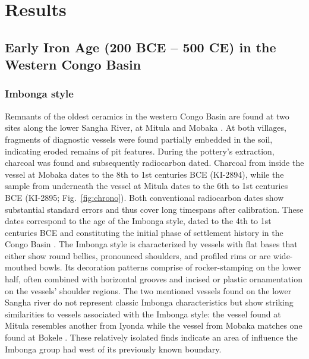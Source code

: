\documentclass[smallextended,natbib]{svjour3}       %
\begin{document}
\section*{Results}

\subsection*{Early Iron Age (200 BCE – 500 CE) in the Western Congo Basin}

\subsubsection*{Imbonga style}

Remnants of the oldest ceramics in the western Congo Basin are found at two sites along the lower Sangha River, at Mitula and Mobaka \citep[Fig.~\ref{fig:map};][169--172, 306--307]{Seidensticker.2021e}. At both villages, fragments of diagnostic vessels were found partially embedded in the soil, indicating eroded remains of pit features. During the pottery's extraction, charcoal was found and subsequently radiocarbon dated. Charcoal from inside the vessel at Mobaka dates to the 8th to 1st centuries BCE (KI-2894), while the sample from underneath the vessel at Mitula dates to the 6th to 1st centuries BCE (KI-2895; Fig.~\ref{fig:chrono}). Both conventional radiocarbon dates show substantial standard errors and thus cover long timespans after calibration. These dates correspond to the age of the Imbonga style, dated to the 4th to 1st centuries BCE and constituting the initial phase of settlement history in the Congo Basin \citep[Fig.~\ref{fig:bayes}; \ref{fig:chrono}; Tab.~\ref{tab:bayes};][59--68]{Wotzka.1995}. The Imbonga style is characterized by vessels with flat bases that either show round bellies, pronounced shoulders, and profiled rims or are wide-mouthed bowls. Its decoration patterns comprise of rocker-stamping on the lower half, often combined with horizontal grooves and incised or plastic ornamentation on the vessels' shoulder regions. The two mentioned vessels found on the lower Sangha river do not represent classic Imbonga characteristics but show striking similarities to vessels associated with the Imbonga style: the vessel found at Mitula resembles another from Iyonda \citep[441 Pl.~7.7]{Wotzka.1995} while the vessel from Mobaka matches one found at Bokele \citep[453 Pl.~19.10]{Wotzka.1995}. These relatively isolated finds indicate an area of influence the Imbonga group had west of its previously known boundary.
\end{document}
